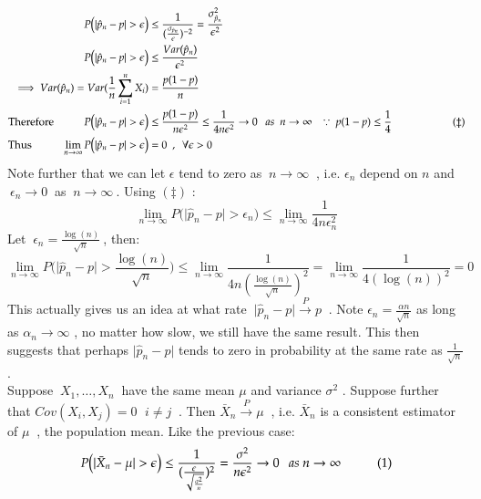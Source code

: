 \documentclass[14pt,twoside,a4paper,fleqn]{article}
\theoremstyle{plain}
\begin{document}
\begin{equation*}
\begin{split}
	P\big(\vert \hat{p}_n - p\vert > \epsilon\big) &\leq \frac{1}{(\frac{\sigma_{\hat{p}_n}}{\epsilon})^{-2}} = \frac{\sigma_{\hat{p}_n}^2}{\epsilon^2}\\
	P\big(\vert \hat{p}_n - p\vert > \epsilon\big) &\leq \frac{Var(\hat{p}_n)}{\epsilon^2}\\
	\implies Var(\hat{p}_n) = Var(\frac{1}{n}\sum_{i=1}^n X_i) &= \frac{p(1-p)}{n}\\
\text{Therefore\tab} P\big(\vert \hat{p}_n - p\vert > \epsilon\big) &\leq \frac{p(1-p)}{n\epsilon^2} \leq \frac{1}{4 n \epsilon^2} \to 0\ \ \ as\ \ n\to\infty\ \ \ \because\ p(1-p)\leq \frac{1}{4}\tab[2cm] (\ddagger)\\
\text{Thus\tab} \lim\limits_{n\to\infty} P\big(\vert\hat{p}_n - p\vert > \epsilon\big) &= 0 \ \ , \ \ \forall \epsilon>0
\end{split}
\end{equation*}
Note further that we can let $\epsilon$ tend to zero as $\ n\to\infty\ $ , i.e. $\epsilon_n$ depend on $n$ and $\ \epsilon_n\to 0\ $ as $\ n\to\infty\ $. Using $(\ddagger)$ :
$$
	\lim\limits_{n\to\infty} P\big(\vert\hat{p}_n - p\vert > \epsilon_n\big) \leq \lim\limits_{n\to\infty} \frac{1}{4 n \epsilon^2_n}
$$
Let $\ \epsilon_n = \frac{\log(n)}{\sqrt{n}}\ $, then:
$$
	\lim\limits_{n\to\infty} P\big(\vert\hat{p}_n -p\vert > \frac{\log(n)}{\sqrt{n}}\big) \leq \lim\limits_{n\to\infty} \frac{1}{4 n (\frac{\log(n)}{\sqrt{n}})^2} = \lim\limits_{n\to\infty} \frac{1}{4(\log(n))^2} = 0
$$
This actually gives us an idea at what rate $\ \vert \hat{p}_n - p \vert \xrightarrow{P} p\ $ . Note $\epsilon_n = \frac{\alpha n}{\sqrt{n}}$ as long as $\alpha_n\to\infty$ , no matter how slow,  we still have the same result. This then suggests that perhaps $\vert \hat{p}_n - p\vert$ tends to zero in probability at the same rate as $\frac{1}{\sqrt{n}}$.\\
Suppose $\ X_1,\ldots,X_n\ $ have the same mean $\mu$ and variance $\sigma^2$ . Suppose further that \mbox{$Cov(X_i,X_j) = 0 \ \, \ i\neq j\ $} . Then \mbox{$\bar{X}_n \xrightarrow{P} \mu\ $} , i.e. $\bar{X}_n$ is a consistent estimator of $\mu\ $ , the population mean. Like the previous case:\\
$$
	P\big(\vert \bar{X}_n - \mu \vert > \epsilon\big) \leq \frac{1}{(\frac{\epsilon}{\sqrt{\frac{\sigma^2}{n}}})^2} = \frac{\sigma^2}{n\epsilon^2} \to 0 \ \ \ as\ n\to\infty\tab (1)
$$ 
\end{document}
